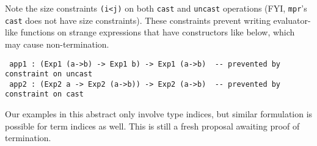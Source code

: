\documentclass[a4paper]{easychair} %
\begin{document}
\noindent
Note the size constraints \texttt{(i\;<\;j)} on both \texttt{cast} and \texttt{uncast} operations
(FYI, \texttt{mpr}'s \texttt{cast} does not have size constraints).
These constraints prevent writing evaluator-like functions on strange expressions
that have constructors like below, which may cause non-termination.\vspace*{-.5ex}
{\small
\begin{verbatim}
 app1 : (Exp1 (a->b) -> Exp1 b) -> Exp1 (a->b)  -- prevented by constraint on uncast
 app2 : (Exp2 a -> Exp2 (a->b)) -> Exp2 (a->b)  -- prevented by constraint on cast
\end{verbatim} }\vspace*{-.5ex}
\noindent
Our examples in this abstract only involve type indices, but similar
formulation is possible for term indices as well.\vspace*{-1.5ex}
This is still a fresh proposal awaiting proof of termination.
\end{document}
